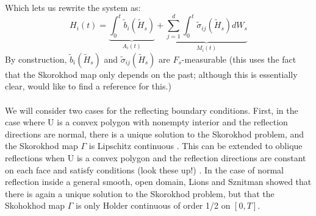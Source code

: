 \documentclass[]{article}
\theoremstyle{definition}
\theoremstyle{assumption}
\theoremstyle{remark}
\begin{document}
Which lets us rewrite the system as:
\begin{equation} \label{eq:fSDE}
H_i(t) =  \underbrace{ \int_0^t \tilde{b}_i(\tilde{H}_s)}_{A_i(t)}+ \underbrace{\sum_{j=1}^d \int_0^t  \tilde{\sigma}_{ij}(\tilde{H}_s)dW_s }_{M_i(t)}
\end{equation}
By construction, $\tilde{b}_i(\tilde{H}_s)$ and $\tilde{\sigma}_{ij}(\tilde{H}_s)$ are $F_s$-measurable (this uses the fact that the Skorokhod map only depends on the past; although this is essentially clear, would like to find a reference for this.) \\ \\

We will consider two cases for the reflecting boundary conditions. First, in the case where U is a convex polygon with nonempty interior and the reflection directions are normal, there is a unique solution to the Skorokhod problem, and the Skorokhod map $\Gamma$ is Lipschitz continuous \cite{Dupuis91}. This can be extended to oblique reflections when U is a convex polygon and the reflection directions are constant on each face and satisfy conditions (look these up!) \cite{Dupuis91}. In the case of normal reflection inside a general smooth, open domain, Lions and Sznitman \cite[Theorem 1.1]{Lions84} showed that there is again a unique solution to the Skorokhod problem, but that the Skohokhod map $\Gamma$ is only Holder continuous of order 1/2 on $[0, T]$.
\end{document}
